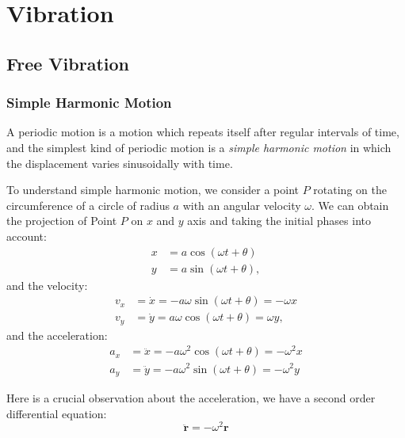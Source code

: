 \documentclass[UTF8]{book}
\begin{document}
\frontmatter

\tableofcontents
\clearpage

\mainmatter
\chapter{Vibration}
\section{Free Vibration}
\subsection{Simple Harmonic Motion}
A periodic motion is a motion which repeats itself after regular intervals of time, 
and the simplest kind of periodic motion is a \emph{simple harmonic motion} 
in which the displacement varies sinusoidally with time.

To understand simple harmonic motion, we consider a point $P$ rotating 
on the circumference of a circle of radius $a$ with an angular velocity $\omega $.
We can obtain the projection of Point $P$ on $x$ and $y$ axis and taking the initial phases into account:
\begin{align*}
x&=a\cos (\omega t+\theta)\\
y&=a\sin (\omega t+\theta),
\end{align*}
and the velocity:
\begin{align*}
v_x&=\dot{x}=-a\omega \sin (\omega t+\theta)=-\omega x\\
v_y&=\dot{y}=a\omega \cos (\omega t+\theta)=\omega y,
\end{align*}
and the acceleration:
\begin{align*}
a_x&=\ddot{x}=-a\omega ^2\cos (\omega t+\theta)=-\omega ^2x\\
a_y&=\ddot{y}=-a\omega ^2\sin (\omega t+\theta)=-\omega ^2y
\end{align*}

Here is a crucial observation about the acceleration, we have a second order differential equation:
\begin{equation}\label{eq:1}
\ddot{\mathbf{r}}=-\omega ^2\mathbf{r}
\end{equation}
\end{document}
